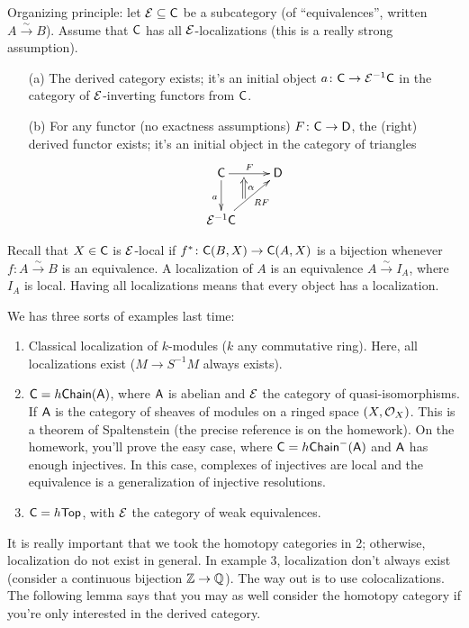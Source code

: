 
Organizing principle: let $\mathcal{E}\subseteq \text{\sf C}$ be a subcategory (of ``equivalences'', written $A\xrightarrow\sim B$). Assume that $\text{\sf C}$ has all $\mathcal{E}$-localizations (this is a really strong assumption).
\begin{itemize}
 \item[(a)] The derived category exists; it's an initial object $a\colon \text{\sf C}\to \mathcal{E}^{-1}\text{\sf C}$ in the category of $\mathcal{E}$-inverting functors from $\text{\sf C}$.
 \item[(b)] For any functor (no exactness assumptions) $F\colon \text{\sf C}\to \text{\sf D}$, the (right) derived functor exists; it's an initial object in the category of triangles
 \[\xymatrix{
  \C\ar[r]^-F_(.4){}="b"\ar[d]_a & \D\\
  \E^{-1}\C \ar[ur]_-{RF}^(.4){}="a"
  \ar@{=>}_\alpha "a";"b"
 }\]
\end{itemize}
Recall that $X\in \text{\sf C}$ is $\mathcal{E}$-local if $f^*\colon\text{\sf C}(B,X)\to \text{\sf C}(A,X)$ is a bijection whenever $f\colon A\xrightarrow\sim B$ is an equivalence. A localization of $A$ is an equivalence $A\xrightarrow\sim I_A$, where $I_A$ is local. Having all localizations means that every object has a localization.
\begin{example}
 We has three sorts of examples last time:
 \begin{enumerate}
  \item Classical localization of $k$-modules ($k$ any commutative ring). Here, all localizations exist ($M\to S^{-1}M$ always exists).
  \item $\text{\sf C}=h\text{\sf Chain}(\text{\sf A})$, where $\text{\sf A}$ is abelian and $\mathcal{E}$ the category of quasi-isomorphisms. If $\text{\sf A}$ is the category of sheaves of modules on a ringed space $(X,\mathcal{O}_X)$. This is a theorem of Spaltenstein (the precise reference is on the homework). On the homework, you'll prove the easy case, where $\text{\sf C}=h\text{\sf Chain}^-(\text{\sf A})$ and $\text{\sf A}$ has enough injectives. In this case, complexes of injectives are local and the equivalence is a generalization of injective resolutions.
  \item $\text{\sf C}=h\text{\sf Top}$, with $\mathcal{E}$ the category of weak equivalences.
 \end{enumerate}
 It is really important that we took the homotopy categories in 2; otherwise, localization do not exist in general. In example 3, localization don't always exist (consider a continuous bijection $\mathbb{Z}\to \mathbb{Q}$). The way out is to use colocalizations. The following lemma says that you may as well consider the homotopy category if you're only interested in the derived category.
\end{example}
